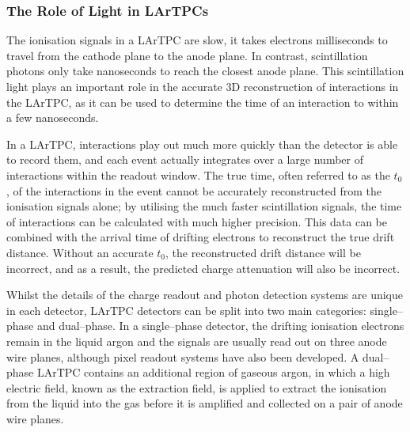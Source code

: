 \subsubsection*{The Role of Light in LArTPCs}

The ionisation signals in a LArTPC are slow, it takes electrons milliseconds to
travel from the cathode plane to the anode plane. In contrast, scintillation 
photons only take nanoseconds to reach the closest anode plane. This 
scintillation light plays an important role in the accurate 3D reconstruction 
of interactions in the LArTPC, as it can be used to determine the time of an 
interaction to within a few nanoseconds.

In a LArTPC, interactions play out much more quickly than the detector is able 
to record them, and each event actually integrates over a large number of 
interactions within the readout window. The true time, often referred to as 
the $t_0$, of the interactions in the event cannot be accurately reconstructed 
from the ionisation signals alone; by utilising the much faster scintillation 
signals, the time of interactions can be calculated with much higher 
precision.  This data can be combined with the arrival time of drifting 
electrons to reconstruct the true drift distance. Without an accurate $t_0$, 
the reconstructed drift distance will be incorrect, and as a result, the 
predicted charge attenuation will also be incorrect.

Whilst the details of the charge readout and photon detection systems are unique
in each detector, LArTPC detectors can be split into two main categories: 
single--phase and dual--phase. In a single--phase detector, the drifting 
ionisation electrons remain in the liquid argon and the signals are usually 
read out on three anode wire planes, although pixel readout systems have also 
been developed\cite{argoncube}. A dual--phase LArTPC contains an additional 
region of gaseous argon, in which a high electric field, known as the 
extraction field, is applied to extract the ionisation from the liquid into 
the gas before it is amplified and collected on a pair of anode wire 
planes\cite{Abi:2020wmh}.

